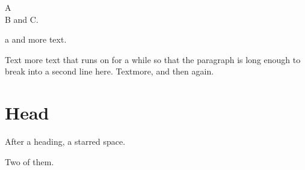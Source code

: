 \documentclass{article}
\begin{document}
\noindent A\\
\noindent B and \noindent C.

\vspace*{2cm}a and more text.

Text \vspace*{3pt} more text that runs on for a while so that the paragraph is long enough to break into a second line here.
Text\vspace{1em}more, and then \vspace{-2pt plus 1pt} again.

\section{Head}
\vspace*{1ex}After a heading, a starred space.

\vspace{4pt}\vspace*{5pt}\label{x}Two of them.
\end{document}
